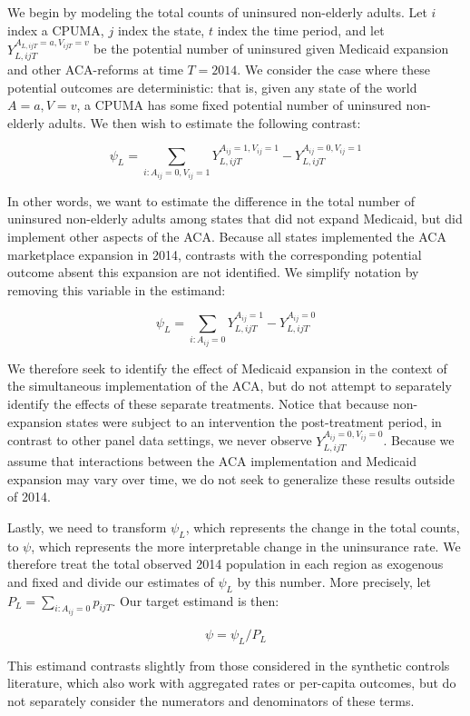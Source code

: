 \documentclass[12pt]{article}
\begin{document}
We begin by modeling the total counts of uninsured non-elderly adults. Let $i$ index a CPUMA, $j$ index the state, $t$ index the time period, and let $Y_{L, ijT}^{A_{L, ijT} = a, V_{ijT} = v}$ be the potential number of uninsured given Medicaid expansion and other ACA-reforms at time $T = 2014$. We consider the case where these potential outcomes are deterministic: that is, given any state of the world $A = a, V = v$, a CPUMA has some fixed potential number of uninsured non-elderly adults. We then wish to estimate the following contrast:

$$
\psi_L = \sum_{i: A_{ij} = 0, V_{ij} = 1} Y_{L, ijT}^{A_{ij} = 1, V_{ij} = 1} - Y_{L, ijT}^{A_{ij} = 0, V_{ij} = 1} 
$$

In other words, we want to estimate the difference in the total number of uninsured non-elderly adults among states that did not expand Medicaid, but did implement other aspects of the ACA. Because all states implemented the ACA marketplace expansion in 2014, contrasts with the corresponding potential outcome absent this expansion are not identified. We simplify notation by  removing this variable in the estimand:

$$
\psi_L = \sum_{i: A_{ij} = 0} Y_{L, ijT}^{A_{ij} = 1} - Y_{L, ijT}^{A_{ij} = 0}
$$

We therefore seek to identify the effect of Medicaid expansion in the context of the simultaneous implementation of the ACA, but do not attempt to separately identify the effects of these separate treatments. Notice that because non-expansion states were subject to an intervention the post-treatment period, in contrast to other panel data settings, we never observe $Y_{L, ijT}^{A_{ij} = 0, V_{ij} = 0}$. Because we assume that interactions between the ACA implementation and Medicaid expansion may vary over time, we do not seek to generalize these results outside of 2014. 

Lastly, we need to transform $\psi_L$, which represents the change in the total counts, to $\psi$, which represents the more interpretable change in the uninsurance rate. We therefore treat the total observed 2014 population in each region as exogenous and fixed and divide our estimates of $\psi_L$ by this number. More precisely, let $P_L = \sum_{i: A_{ij} = 0} p_{ijT}$. Our target estimand is then:

$$
\psi = \psi_L/P_L
$$

This estimand contrasts slightly from those considered in the synthetic controls literature, which also work with aggregated rates or per-capita outcomes, but do not separately consider the numerators and denominators of these terms.
\end{document}
